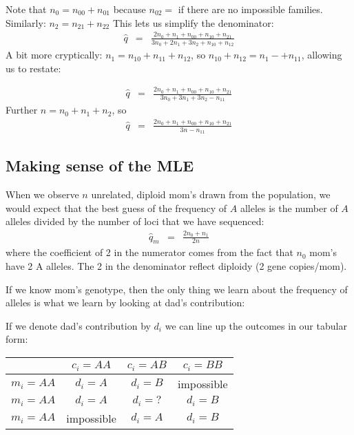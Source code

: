 \documentclass[11pt]{article}
\begin{document}
Note that $n_0 = n_{00} + n_{01}$ because $n_{02}=$ if there are no impossible families.
Similarly: $n_2 = n_{21} + n_{22}$ 
This lets us simplify the denominator:
\begin{eqnarray}
\hat{q} & = & \frac{2n_0 + n_1 + n_{00} + n_{10} +n_{21}}{3n_0 + 2n_1 + 3n_2 + n_{10} + n_{12}}  \nonumber
\end{eqnarray}
A bit more cryptically: $n_{1} = n_{10} + n_{11} + n_{12}$, so $n_{10}  + n_{12} = n_1 -+ n_{11}$, allowing us to restate:

\begin{eqnarray}
\hat{q} & = & \frac{2n_0 + n_1 + n_{00} + n_{10} +n_{21}}{3n_0 + 3n_1 + 3n_2 - n_{11}}  \nonumber
\end{eqnarray}
Further $n= n_0 + n_1 + n_2$, so
\begin{eqnarray}
\hat{q} & = & \frac{2n_0 + n_1 + n_{00} + n_{10} +n_{21}}{3n - n_{11}}  \nonumber
\end{eqnarray}

\subsection*{Making sense of the MLE}
When we observe $n$ unrelated, diploid mom's drawn from the population, we would expect that the 
best guess of the frequency of $A$ alleles is the number of $A$ alleles divided by the number of loci that 
we have sequenced:
\begin{eqnarray}
  \hat{q}_m & = & \frac{2n_{0} + n_{1}}{2n}
\end{eqnarray}
where the coefficient of 2 in the numerator comes from the fact that $n_0$ mom's have 2 A alleles.
The 2 in the denominator reflect diploidy (2 gene copies/mom).

If we know mom's genotype, then the only thing we learn about the frequency of alleles is what we learn
by looking at dad's contribution:

If we denote dad's contribution by $d_i$ we can line up the outcomes in our tabular form:
\begin{table}[h!]
\begin{tabular}{r|c|c|c}
& $c_i=AA$ & $c_i=AB$ & $c_i=BB$ \\
\hline
$m_i=AA$ & $d_i=A$       & $d_i=B$ & impossible\\
$m_i=AA$ & $d_i=A$       & $d_i=?$ & $d_i=B$\\
$m_i=AA$ & impossible       & $d_i=A$ & $d_i=B$\\
\hline
\end{tabular}
\end{table}
\end{document}
